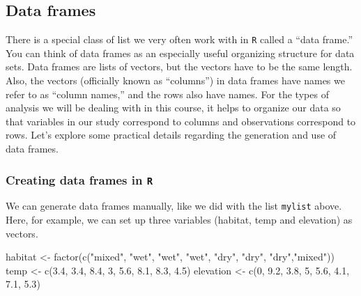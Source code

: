 \documentclass[
]{book}
\newenvironment{Shaded}{\begin{snugshade}}{\end{snugshade}}
\newcommand{\DecValTok}[1]{\textcolor[rgb]{0.00,0.00,0.81}{#1}}
\newcommand{\FloatTok}[1]{\textcolor[rgb]{0.00,0.00,0.81}{#1}}
\newcommand{\FunctionTok}[1]{\textcolor[rgb]{0.00,0.00,0.00}{#1}}
\newcommand{\NormalTok}[1]{#1}
\newcommand{\OtherTok}[1]{\textcolor[rgb]{0.56,0.35,0.01}{#1}}
\newcommand{\StringTok}[1]{\textcolor[rgb]{0.31,0.60,0.02}{#1}}
\begin{document}
\hypertarget{data-frames}{%
\subsection{Data frames}\label{data-frames}}

There is a special class of list we very often work with in \texttt{R} called a ``data frame.'' You can think of data frames as an especially useful organizing structure for data sets. Data frames are lists of vectors, but the vectors have to be the same length. Also, the vectors (officially known as ``columns'') in data frames have names we refer to as ``column names,'' and the rows also have names. For the types of analysis we will be dealing with in this course, it helps to organize our data so that variables in our study correspond to columns and observations correspond to rows. Let's explore some practical details regarding the generation and use of data frames.

\hypertarget{creating-data-frames-in-r}{%
\subsubsection{\texorpdfstring{Creating data frames in \texttt{R}}{Creating data frames in R}}\label{creating-data-frames-in-r}}

We can generate data frames manually, like we did with the list \texttt{mylist} above. Here, for example, we can set up three variables (habitat, temp and elevation) as vectors.

\begin{Shaded}
\begin{Highlighting}[]
\NormalTok{habitat }\OtherTok{\textless{}{-}} \FunctionTok{factor}\NormalTok{(}\FunctionTok{c}\NormalTok{(}\StringTok{"mixed"}\NormalTok{, }\StringTok{"wet"}\NormalTok{, }\StringTok{"wet"}\NormalTok{, }\StringTok{"wet"}\NormalTok{, }\StringTok{"dry"}\NormalTok{, }\StringTok{"dry"}\NormalTok{, }\StringTok{"dry"}\NormalTok{,}\StringTok{"mixed"}\NormalTok{))}
\NormalTok{temp }\OtherTok{\textless{}{-}} \FunctionTok{c}\NormalTok{(}\FloatTok{3.4}\NormalTok{, }\FloatTok{3.4}\NormalTok{, }\FloatTok{8.4}\NormalTok{, }\DecValTok{3}\NormalTok{, }\FloatTok{5.6}\NormalTok{, }\FloatTok{8.1}\NormalTok{, }\FloatTok{8.3}\NormalTok{, }\FloatTok{4.5}\NormalTok{)}
\NormalTok{elevation }\OtherTok{\textless{}{-}} \FunctionTok{c}\NormalTok{(}\DecValTok{0}\NormalTok{, }\FloatTok{9.2}\NormalTok{, }\FloatTok{3.8}\NormalTok{, }\DecValTok{5}\NormalTok{, }\FloatTok{5.6}\NormalTok{, }\FloatTok{4.1}\NormalTok{, }\FloatTok{7.1}\NormalTok{, }\FloatTok{5.3}\NormalTok{)}
\end{Highlighting}
\end{Shaded}
\end{document}
